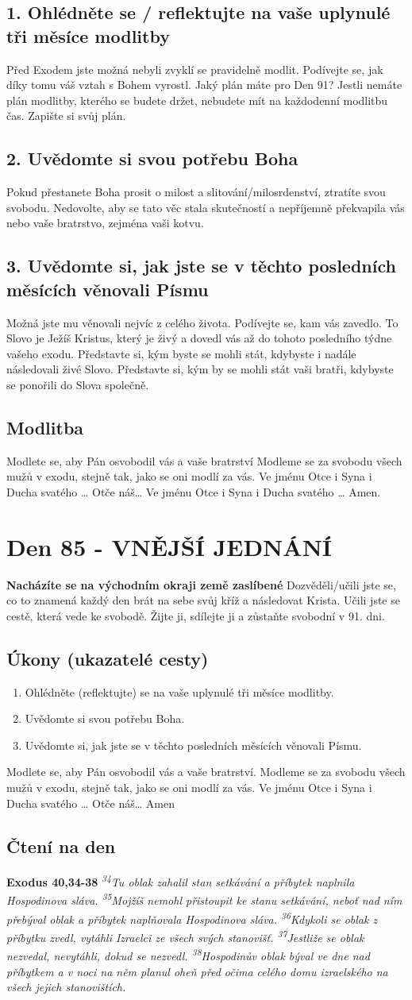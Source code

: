 \documentclass[11pt]{article}
\newcommand{\zacatekTrinactyTyden}{
\textbf{Nacházíte se na východním okraji země zaslíbené} \newline 
Dozvěděli/učili jste se, co to znamená každý den brát na sebe svůj kříž a následovat Krista. Učili jste se cestě, která vede ke svobodě. Žijte ji, sdílejte ji a zůstaňte svobodní v 91. dni.

\subsection*{Úkony (ukazatelé cesty)}
\begin{enumerate}
  \item Ohlédněte (reflektujte) se na vaše uplynulé tři měsíce modlitby.
  \item Uvědomte si svou potřebu Boha.
  \item Uvědomte si, jak jste se v těchto posledních měsících věnovali Písmu.
\end{enumerate}
Modlete se, aby Pán osvobodil vás a vaše bratrství. \newline
Modleme se za svobodu všech mužů v exodu, stejně tak, jako se oni modlí za vás.\newline
Ve jménu Otce i Syna i Ducha svatého …  Otče náš… Amen
}
\begin{document}
\subsection*{1. Ohlédněte se / reflektujte na vaše uplynulé tři měsíce modlitby}
Před Exodem jste možná nebyli zvyklí se pravidelně modlit. Podívejte se, jak díky tomu váš vztah s Bohem vyrostl. Jaký plán máte pro Den 91? Jestli nemáte plán modlitby, kterého se budete držet, nebudete mít na každodenní modlitbu čas. Zapište si svůj plán.
\subsection*{2. Uvědomte si svou potřebu Boha}
Pokud přestanete Boha prosit o milost a slitování/milosrdenství, ztratíte svou svobodu. Nedovolte, aby se tato věc stala skutečností a nepříjemně překvapila vás nebo vaše bratrstvo, zejména vaši kotvu.
\subsection*{3. Uvědomte si, jak jste se v těchto posledních měsících věnovali Písmu}
Možná jste mu věnovali nejvíc z celého života. Podívejte se, kam vás zavedlo. To Slovo je Ježíš Kristus, který je živý a dovedl vás až do tohoto posledního týdne vašeho exodu. Představte si, kým byste se mohli stát, kdybyste i nadále následovali živé Slovo. Představte si, kým by se mohli stát vaši bratři, kdybyste se ponořili do Slova společně.

\subsection*{Modlitba}
Modlete se, aby Pán osvobodil vás a vaše bratrství \newline
Modleme se za svobodu všech mužů v exodu, stejně tak, jako se oni modlí za vás.\newline
Ve jménu Otce i Syna i Ducha svatého … Otče náš… Ve jménu Otce i Syna i Ducha svatého … Amen.
\newpage

\newpage
\section{Den 85 - VNĚJŠÍ JEDNÁNÍ}
\zacatekTrinactyTyden
\subsection*{Čtení na den}
\textbf{Exodus 40,34-38}
\newline
\textit{
\textsuperscript{34}Tu oblak zahalil stan setkávání a příbytek naplnila Hospodinova sláva.
\textsuperscript{35}Mojžíš nemohl přistoupit ke stanu setkávání, neboť nad ním přebýval oblak a příbytek naplňovala Hospodinova sláva.
\textsuperscript{36}Kdykoli se oblak z příbytku zvedl, vytáhli Izraelci ze všech svých stanovišť.
\textsuperscript{37}Jestliže se oblak nezvedal, nevytáhli, dokud se nezvedl.
\textsuperscript{38}Hospodinův oblak býval ve dne nad příbytkem a v noci na něm planul oheň před očima celého domu izraelského na všech jejich stanovištích.
}
\end{document}
